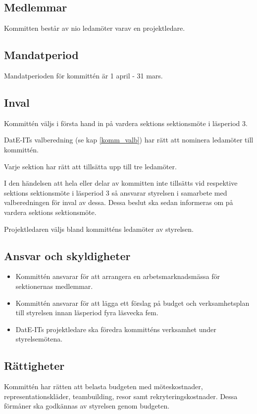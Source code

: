 \documentclass{article}
\begin{document}
\subsection{Medlemmar}
Kommitten består av nio ledamöter varav en projektledare.

\subsection{Mandatperiod}
Mandatperioden för kommittén är 1 april - 31 mars.

\subsection{Inval} \label{komm_inval}
Kommittén väljs i första hand in på vardera sektions sektionsmöte i läsperiod 3.

DatE-ITs valberedning (se kap \ref{komm_valb}) har rätt att nominera ledamöter till kommittén.

Varje sektion har rätt att tillsätta upp till tre ledamöter. 

I den händelsen att hela eller delar av kommitten inte tillsätts vid respektive sektions sektionsmöte i läsperiod 3 så ansvarar styrelsen i samarbete med valberedningen för inval av dessa. Dessa beslut ska sedan informeras om på vardera sektions sektionsmöte. 

Projektledaren väljs bland kommitténs ledamöter av styrelsen.

\subsection{Ansvar och skyldigheter}
\begin{itemize}
    \item Kommittén ansvarar för att arrangera en arbetsmarknadsmässa för sektionernas medlemmar. 
    \item Kommittén ansvarar för att lägga ett förslag på budget och verksamhetsplan till styrelsen innan läsperiod fyra läsvecka fem.
    \item DatE-ITs projektledare ska föredra kommitténs verksamhet under styrelsemötena.
\end{itemize}

\subsection{Rättigheter}
Kommittén har rätten att belasta budgeten med möteskostnader, representationskläder, teambuilding, resor samt rekryteringskostnader. Dessa förmåner ska godkännas av styrelsen genom budgeten.
\end{document}
